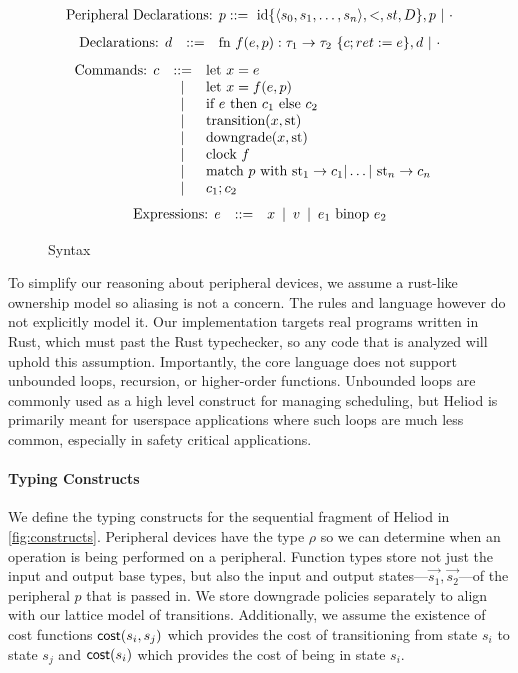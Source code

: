 \begin{figure}
\small
\[
\begin{array}{lcll}
\text{Peripheral Declarations: }p ::= \ \text{id} \{\langle s_{0},s_{1},\ldots,s_{n}\rangle, <, st, D \}, p \ \vert \ \cdot 
\end{array}
\]
\[
\begin{array}{lcll}
\text{Declarations: }d & ::= & \text{fn } f(e, p): \tau_1 \rightarrow \tau_2 \ \{c; ret := e\}, d \ \vert \ \cdot
\end{array}
\]
\[
\begin{array}{lcll}
\text{Commands: }c & ::= & \text{let } x = e & \\ & \,|\, & \text{let } x = f(e, p) \\ & \,|\, & \text{if } e \text{ then } c_1 \text{ else } c_2  \\ & \,|\, & \text{transition}(x, \text{st})  \\ & \,|\, & \text{downgrade}(x, \text{st}) \\ & \,|\, & \text{clock } f \\ & \,|\, & \text{match }p \text{ with } \text{st}_1 \rightarrow c_1 | \dots | \text{ st}_n \rightarrow c_n  \\ & \,|\, & c_1; c_2 
\end{array}
\]
\[
\begin{array}{lcll}
\text{Expressions: }e & \bnfdef & x \ \bnfalt \ v \ \bnfalt \ e_1 \text{ binop } e_2 
\end{array}
\]
\caption{Syntax}
\label{fig: syntax}
\end{figure}

To simplify our reasoning about peripheral devices, we assume a rust-like ownership model so aliasing is not a concern. The rules and language however do not explicitly model it. Our implementation targets real programs written in Rust, which must past the Rust typechecker, so any code that is analyzed will uphold this assumption. Importantly, the core language does not support unbounded loops, recursion, or higher-order functions. Unbounded loops are commonly used as a high level construct for managing scheduling, but Heliod is primarily meant for userspace applications where such loops are much less common, especially in safety critical applications. \cite{https://spinroot.com/gerard/pdf/P10.pdf} 

\paragraph{Typing Constructs}
We define the typing constructs for the sequential fragment of Heliod in \autoref{fig:constructs}. Peripheral devices have the type $\rho$ so we can determine when an operation is being performed on a peripheral. Function types store not just the input and output base types, but also the input and output states---$\Vec{s_1}, \Vec{s_2}$---of the peripheral $p$ that is passed in. We store downgrade policies separately to align with our lattice model of transitions. Additionally, we assume the existence of cost functions $\mathsf{cost}(s_i, s_j)$ which provides the cost of transitioning from state $s_i$ to state $s_j$ and $\mathsf{cost}(s_i)$ which provides the cost of being in state $s_i$. 

